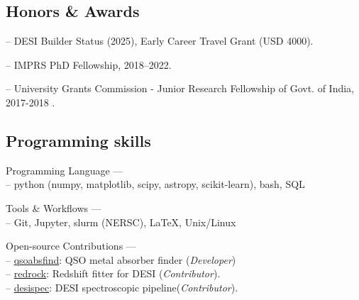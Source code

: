\documentclass[12pt,letterpaper]{article}
\begin{document}
\subsection{Honors \& Awards}

\begin{list}{}{\cvlist}
  \item -- DESI Builder Status (2025), Early Career Travel Grant (USD 4000).
  \item -- IMPRS PhD Fellowship, 2018--2022.
  \item -- University Grants Commission - Junior Research Fellowship of Govt. of India, 2017-2018 .
\end{list}

\subsection{Programming skills}
\begin{list}{}{\cvlist}
\item Programming Language ---\\
   -- python (numpy, matplotlib, scipy, astropy, scikit-learn), bash, SQL
  \item Tools \& Workflows ---\\
  -- Git, Jupyter, slurm (NERSC), LaTeX, Unix/Linux  
\item Open-source Contributions ---\\
   -- \href{https://github.com/abhi0395/qsoabsfind}{qsoabsfind}: QSO metal absorber finder (\textit{Developer})\\
   -- \href{https://github.com/desihub/redrock}{redrock}: Redshift fitter for DESI (\textit{Contributor}).\\
   -- \href{https://github.com/desihub/desispec}{desispec}: DESI spectroscopic pipeline(\textit{Contributor}).
\end{list}

\end{document}
